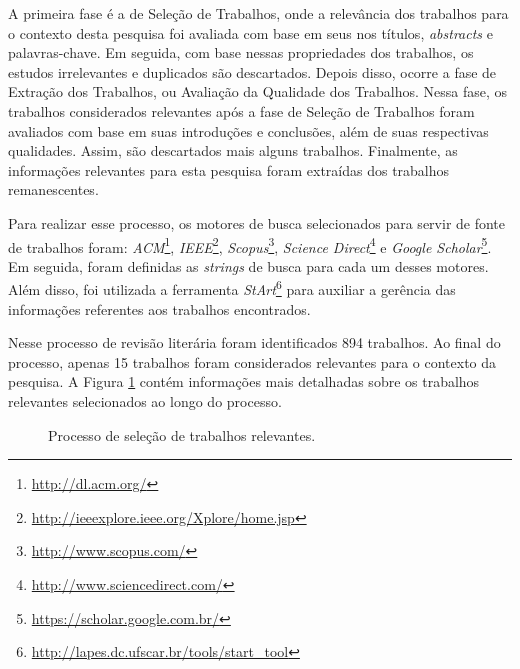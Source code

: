 A primeira fase é a de Seleção de Trabalhos, onde a relevância dos trabalhos para o contexto desta pesquisa foi avaliada com base em seus nos títulos, \textit{abstracts} e palavras-chave. Em seguida, com base nessas propriedades dos trabalhos, os estudos irrelevantes e duplicados são descartados. Depois disso, ocorre a fase de Extração dos Trabalhos, ou Avaliação da Qualidade dos Trabalhos. Nessa fase, os trabalhos considerados relevantes após a fase de Seleção de Trabalhos foram avaliados com base em suas introduções e conclusões, além de suas respectivas qualidades. Assim, são descartados mais alguns trabalhos. Finalmente, as informações relevantes para esta pesquisa foram extraídas dos trabalhos remanescentes.

Para realizar esse processo, os motores de busca selecionados para servir de fonte de trabalhos foram: \textit{ACM}\footnote{\url{http://dl.acm.org/}}, \textit{IEEE}\footnote{\url{http://ieeexplore.ieee.org/Xplore/home.jsp}}, \textit{Scopus}\footnote{\url{http://www.scopus.com/}}, \textit{Science Direct}\footnote{\url{http://www.sciencedirect.com/}} e \textit{Google Scholar}\footnote{\url{https://scholar.google.com.br/}}. Em seguida, foram definidas as \textit{strings} de busca para cada um desses motores. Além disso, foi utilizada a ferramenta \textit{StArt}\footnote{\url{http://lapes.dc.ufscar.br/tools/start_tool}} para auxiliar a gerência das informações referentes aos trabalhos encontrados.

Nesse processo de revisão literária foram identificados 894 trabalhos. Ao final do processo, apenas 15 trabalhos foram considerados relevantes para o contexto da pesquisa. A Figura \ref{fundamentacao:ageis:fatores:revisao} contém informações mais detalhadas sobre os trabalhos relevantes selecionados ao longo do processo.

\begin{figure}[H]
\begin{center}
    \end{center}
    \caption{Processo de seleção de trabalhos relevantes.}
    \label{fundamentacao:ageis:fatores:revisao}
\end{figure}

